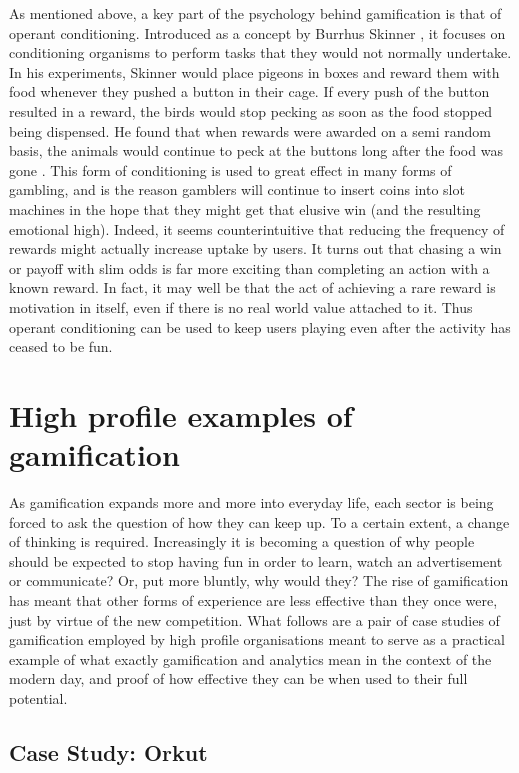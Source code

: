 \documentclass[12pt,a4paper,twoside]{report}
\begin{document}
As mentioned above, a key part of the psychology behind gamification is that of operant conditioning. Introduced as a concept by Burrhus Skinner \cite{skinner1938behavior}, it focuses on conditioning organisms to perform tasks that they would not normally undertake. In his experiments, Skinner would place pigeons in boxes and reward them with food whenever they pushed a button in their cage. If every push of the button resulted in a reward, the birds would stop pecking as soon as the food stopped being dispensed. He found that when rewards were awarded on a semi random basis, the animals would continue to peck at the buttons long after the food was gone \cite{kapp2012gamification}. This form of conditioning is used to great effect in many forms of gambling, and is the reason gamblers will continue to insert coins into slot machines in the hope that they might get that elusive win (and the resulting emotional high). Indeed, it seems counterintuitive that reducing the frequency of rewards might actually increase uptake by users. It turns out that chasing a win or payoff with slim odds is far more exciting than completing an action with a known reward. In fact, it may well be that the act of achieving a rare reward is motivation in itself, even if there is no real world value attached to it. Thus operant conditioning can be used to keep users playing even after the activity has ceased to be fun.

\section{High profile examples of gamification}
As gamification expands more and more into everyday life, each sector is being forced to ask the question of how they can keep up. To a certain extent, a change of thinking is required. Increasingly it is becoming a question of why people should be expected to stop having fun in order to learn, watch an advertisement or communicate? \cite{zichermann2010game} Or, put more bluntly, why would they? The rise of gamification has meant that other forms of experience are less effective than they once were, just by virtue of the new competition. What follows are a pair of case studies of gamification employed by high profile organisations meant to serve as a practical example of what exactly gamification and analytics mean in the context of the modern day, and proof of how effective they can be when used to their full potential.

\subsection{Case Study: Orkut}
\end{document}
